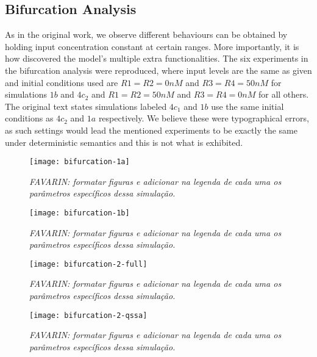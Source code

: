   \subsection{Bifurcation Analysis}

    As in the original work, we observe different behaviours can be obtained by holding input concentration constant at certain ranges.
    More importantly, it is how \citet{originals} discovered the model's multiple extra functionalities.
    The six experiments in the bifurcation analysis were reproduced, where input levels are the same as given and initial conditions used are $R1=R2=0nM$ and $R3=R4=50nM$ for simulations $1b$ and $4c_{2}$ and $R1=R2=50nM$ and $R3=R4=0nM$ for all others.
    The original text states simulations labeled $4c_{1}$ and $1b$ use the same initial conditions as $4c_{2}$ and $1a$ respectively.
    We believe these were typographical errors, as such settings would lead the mentioned experiments to be exactly the same under deterministic semantics and this is not what is exhibited.

    \begin{figure}[!htbp]
      \centering
      \texttt{[image: bifurcation-1a]}
      \caption{\textit{FAVARIN: formatar figuras e adicionar na legenda de cada uma os parâmetros específicos dessa simulação.}}
      \label{fig.bifurcation-1a}
    \end{figure}

    \begin{figure}[!htbp]
      \centering
      \texttt{[image: bifurcation-1b]}
      \caption{\textit{FAVARIN: formatar figuras e adicionar na legenda de cada uma os parâmetros específicos dessa simulação.}}
      \label{fig.bifurcation-1b}
    \end{figure}

    \begin{figure}[!htbp]
      \centering
      \texttt{[image: bifurcation-2-full]}
      \caption{\textit{FAVARIN: formatar figuras e adicionar na legenda de cada uma os parâmetros específicos dessa simulação.}}
      \label{fig.bifurcation-2-full}
    \end{figure}

    \begin{figure}[!htbp]
      \centering
      \texttt{[image: bifurcation-2-qssa]}
      \caption{\textit{FAVARIN: formatar figuras e adicionar na legenda de cada uma os parâmetros específicos dessa simulação.}}
      \label{fig.bifurcation-2-qssa}
    \end{figure}

